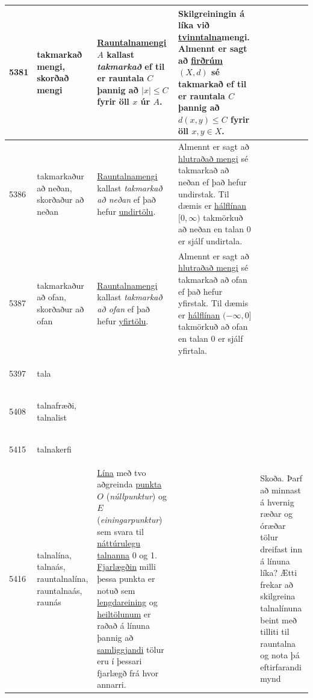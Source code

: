 \begin{longtable}{p{} | p{} | p{} | p{} | p{}}
\hline
5381 & \hypertarget{row:5381}{takmarkað mengi, skorðað mengi} & \hyperlink{row:4093}{Rauntalna}\hyperlink{row:3270}{mengi} \(A\) kallast \textit{takmarkað} ef til er rauntala \(C\) þannig að \(|x| \leq C\) fyrir öll \(x\) úr \(A\). & Skilgreiningin á líka við \hyperlink{row:5682}{tvinntalna}mengi. Almennt er sagt að \hyperlink{row:1200}{firðrúm} \((X,d)\) sé takmarkað ef til er rauntala \(C\) þannig að \(d(x,y) \leq C\) fyrir öll \(x,y \in X\). &  \\
\hline
5386 & \hypertarget{row:5386}{takmarkaður að neðan, skorðaður að neðan} & \hyperlink{row:4093}{Rauntalna}\hyperlink{row:3270}{mengi} kallast \textit{takmarkað að neðan} ef það hefur \hyperlink{row:5818}{undirtölu}. & Almennt er sagt að \hyperlink{row:4009}{hlutraðað mengi} sé takmarkað að neðan ef það hefur undirstak. Til dæmis er \hyperlink{row:1840}{hálflínan} \([0, \infty)\) takmörkuð að neðan en talan 0 er sjálf undirtala. &  \\
\hline
5387 & \hypertarget{row:5387}{takmarkaður að ofan, skorðaður að ofan} & \hyperlink{row:4093}{Rauntalna}\hyperlink{row:3270}{mengi} kallast \textit{takmarkað að ofan} ef það hefur \hyperlink{row:6280}{yfirtölu}. & Almennt er sagt að \hyperlink{row:4009}{hlutraðað mengi} sé takmarkað að ofan ef það hefur yfirstak. Til dæmis er \hyperlink{row:1840}{hálflínan} \((-\infty, 0]\) takmörkuð að ofan en talan 0 er sjálf yfirtala. &  \\
\hline
5397 & \hypertarget{row:5397}{tala} &  &  &  \\
\hline
5408 & \hypertarget{row:5408}{talnafræði, talnalist} &  &  &  \\
\hline
5415 & \hypertarget{row:5415}{talnakerfi} &  &  &  \\
\hline
5416 & \hypertarget{row:5416}{talnalína, talnaás, rauntalnalína, rauntalnaás, raunás} & \hyperlink{row:2911}{Lína} með tvo aðgreinda \hyperlink{row:4001}{punkta} \(O\) (\textit{núllpunktur}) og \(E\) (\textit{einingarpunktur}) sem svara til \hyperlink{row:3475}{náttúrulegu talnanna} 0 og 1. \hyperlink{row:1204}{Fjarlægðin} milli þessa punkta er notuð sem \hyperlink{row:2860}{lengdareining} og \hyperlink{row:1896}{heiltölunum} er raðað á línuna þannig að \hyperlink{row:4458}{samliggjandi} tölur eru í þessari fjarlægð frá hvor annarri. &  & Skoða. Þarf að minnast á hvernig ræðar og óræðar tölur dreifast inn á línuna líka? Ætti frekar að skilgreina talnalínuna beint með tilliti til rauntalna og nota þá eftirfarandi mynd


\end{longtable}

